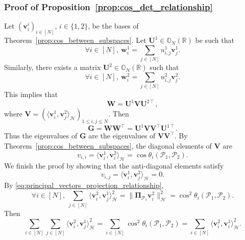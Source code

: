 \documentclass[twoside,11pt]{book}
\numberwithin{theorem}{chapter}
\numberwithin{definition}{chapter}
\numberwithin{proposition}{chapter}
\numberwithin{corollary}{chapter}
\numberwithin{example}{chapter}
\numberwithin{lemma}{chapter}
\numberwithin{assumption}{chapter}
\numberwithin{equation}{chapter}
\numberwithin{figure}{chapter}
\DeclareMathOperator{\Tran}{\intercal}
\begin{document}
\subsubsection{Proof of Proposition~\ref{prop:cos_det_relationship}}
Let $(\bm{v}^{i}_{i})_{i \in [N]}$, $i\in\{1,2\}$, be the bases of Theorem~\ref{prop:cos_between_subspaces}. Let $\bm{U}^{1} \in \mathbb{O}_{N}(\mathbb{R})$ be such that
\begin{equation}
\forall i \in [N], \: \bm{w}^{1}_{i} = \sum\limits_{j \in [N]} u^{1}_{i,j} \bm{v}^{1}_{j}.
\end{equation}
Similarly, there exists a matrix $\bm{U}^{2} \in \mathbb{O}_{N}(\mathbb{R})$ such that
\begin{equation}
\forall i \in [N], \: \bm{w}^{2}_{i} = \sum\limits_{j \in [N]} u^{2}_{i,j} \bm{v}^{2}_{j}.
\end{equation}
This implies that
\begin{equation}
\bm{W} = \bm{U}^{1}\bm{V}\bm{U}^{2 \Tran},
\end{equation}
where $\displaystyle \bm{V} = (\langle \bm{v}^{1}_{i}, \bm{v}^{2}_{j} \rangle_{\mathcal{H}})_{1 \leq i,j \leq N}$. Then
\begin{equation}
\bm{G} = \bm{W}\bm{W}^{\Tran} = \bm{U}^{1}\bm{V}\bm{V}^{\Tran}\bm{U}^{1 \Tran}.
\end{equation}
Thus the eigenvalues of $\bm{G}$ are the eigenvalues of $\bm{V}\bm{V}^{\Tran}$. By Theorem~\ref{prop:cos_between_subspaces}, the diagonal elements of $\bm{V}$ are
\begin{equation}\label{eq:diagonal_of_V}
v_{i,i} = \langle \bm{v}^{1}_{i}, \bm{v}^{2}_{i} \rangle_{\mathcal{H}} = \cos \theta_{i}(\mathcal{P}_{1},\mathcal{P}_{2}).
\end{equation}
We finish the proof by showing that the anti-diagonal elements satisfy
\begin{equation}\label{eq:anti_diagonal_of_V}
v_{i,j} = \langle \bm{v}^{1}_{i}, \bm{v}^{2}_{j} \rangle_{\mathcal{H}} = 0.
\end{equation}
By \eqref{eq:principal_vectors_projection_relationship},
\begin{equation}
\forall i \in [N], \:\sum\limits_{j \in [N]} \langle \bm{v}_{i}^{2}, \bm{v}_{j}^{1}\rangle_{\mathcal{H}}^{2} = \|\bm{\Pi}_{\mathcal{P}_{1}}\bm{v}_{i}^{2}\|_{\mathcal{H}}^{2} = \cos^{2} \theta_{i}(\mathcal{P}_{1},\mathcal{P}_{2}).
\end{equation}
Then
\begin{equation}
 \sum\limits_{i \in [N]}\sum\limits_{j \in [N]} \langle \bm{v}_{i}^{2}, \bm{v}_{j}^{1}\rangle_{\mathcal{H}}^{2} = \sum\limits_{i \in [N]} \cos^{2} \theta_{i}(\mathcal{P}_{1},\mathcal{P}_{2}) = \sum\limits_{i \in [N]} \langle \bm{v}_{i}^{2}, \bm{v}_{i}^{1}\rangle_{\mathcal{H}}^{2} .
\end{equation}
\end{document}
